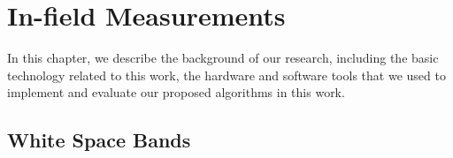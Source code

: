 \chapter{In-field Measurements} 
\label{ch:measurements}

In this chapter, we describe the background of our research, 
including the basic technology related to this work, the 
hardware and software tools that we used to implement and evaluate 
our proposed algorithms in this work.


\section{White Space Bands}


